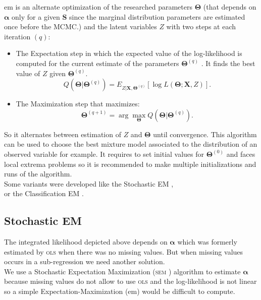 \documentclass[12pt,a4paper]{report}
\begin{document}
{\sc em} is an alternate optimization of the researched parameters $\boldsymbol{\Theta}$ (that depends on $\boldsymbol{\alpha}$ only for a given $\boldsymbol{S}$ since the marginal distribution parameters are estimated once before the MCMC.) and the latent variables $Z$ with two steps at each iteration $(q)$:
\begin{itemize}
	\item The Expectation step in which the expected value of the log-likelihood is computed for the current estimate of the parameters $\boldsymbol{\Theta}^{(q)}$ . It finds the best value of $Z$ given $\boldsymbol{\Theta}^{(q)}$.
	\begin{equation}
		Q(\boldsymbol{\Theta}|\boldsymbol{\Theta}^{(q)})=E_{Z|\boldsymbol{X},\boldsymbol{\Theta}^{(q)}} [\log L(\boldsymbol{\Theta};\boldsymbol{X},Z)].  \nonumber 
	\end{equation}
	\item The Maximization step that maximizes:
	\begin{equation}
		\boldsymbol{\Theta}^{(q+1)}=\arg \max_{\boldsymbol{\Theta}} Q(\boldsymbol{\Theta}|\boldsymbol{\Theta}^{(q)}).  \nonumber 
	\end{equation}
\end{itemize}
	So it alternates between estimation of $Z$ and $\boldsymbol{\Theta}$ until convergence. This algorithm can be used to choose the best mixture model associated to the distribution of an observed variable for example.		
	It requires to set initial values for $\boldsymbol{\Theta}^{(0)}$ and faces local extrema problems so it is recommended to make multiple initializations and runs of the algorithm.\\
			
			Some variants were developed like the Stochastic EM \cite{diebolt1996stochastic},\\
			 \cite{celeux1986algorithme} or the Classification EM \cite{celeux1992classification}.
			
			
\subsection{Stochastic EM}
	The integrated likelihood depicted above depends on $\boldsymbol{\alpha}$ which was formerly estimated by \textsc{ols} when there was no missing values. But when missing values occurs in a sub-regression we need another solution.\\
	
	We use a  Stochastic Expectation Maximization (\textsc{sem} \cite{celeux1986algorithme}) algorithm  to estimate $\boldsymbol{\alpha}$ because missing values do not allow to use \textsc{ols} and  the log-likelihood is not linear so a simple Expectation-Maximization ({\sc em}) would be difficult to compute.\\
	
\end{document}
